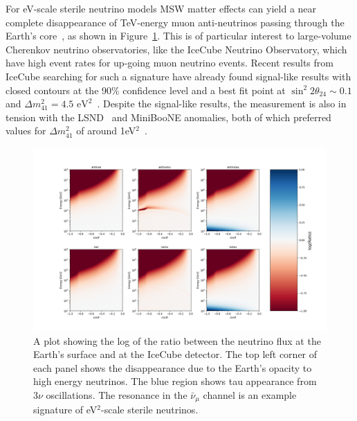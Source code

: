 \documentclass[main.tex]{subfiles}
\begin{document}
For eV-scale sterile neutrino models MSW matter effects can yield a near complete disappearance of TeV-energy muon anti-neutrinos passing through the Earth's core~\cite{Nunokawa:2003ep, Petcov:2016iiu, Choubey:2007ji, Barger:2011rc, Esmaili:2012nz, esmaili2013restricting, Lindner:2015iaa}, as shown in Figure~\ref{fig:sterile_osc_sig}.
This is of particular interest to large-volume Cherenkov neutrino observatories, like the IceCube Neutrino Observatory, which have high event rates for up-going muon neutrino events. 
Recent results from IceCube searching for such a signature have already found signal-like results with closed contours at the 90\% confidence level and a best fit point at $\sin^2 2\theta_{24}\sim0.1$ and $\Delta m^2_{41}=4.5\text{ eV}^2$~\cite{Aartsen_2020, Aartsen_2020_prd}. 
Despite the signal-like results, the measurement is also in tension with the LSND~\cite{Athanassopoulos_1998} and MiniBooNE anomalies, both of which preferred values for $\Delta m_{41}^{2}$ of around 1eV$^{2}$~\cite{kopp2013sterile, Cirelli:2004cz, abazajian2012light, Gariazzo:2017fdh, Dentler:2017tkw, Diaz:2019fwt}.

\begin{figure}
    \centering
    \includegraphics[width=0.8\linewidth]{figures/sterile_flux_plot.png}
    \caption{A plot showing the log of the ratio between the neutrino flux at the Earth's surface and at the IceCube detector. The top left corner of each panel shows the disappearance due to the Earth's opacity to high energy neutrinos. The blue region shows tau appearance from $3\nu$ oscillations. The resonance in the $\bar{\nu}_{\mu}$ channel is an example signature of eV$^{2}$-scale sterile neutrinos.}\label{fig:sterile_osc_sig}
\end{figure}
\end{document}
